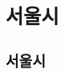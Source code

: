 \documentclass[12pt, a4paper, oneside]{book}
\begin{document}
	\part{ 서울시 }
	\noptcrule
	\parttoc				


	\chapter{ 서울시 }









\end{document}
